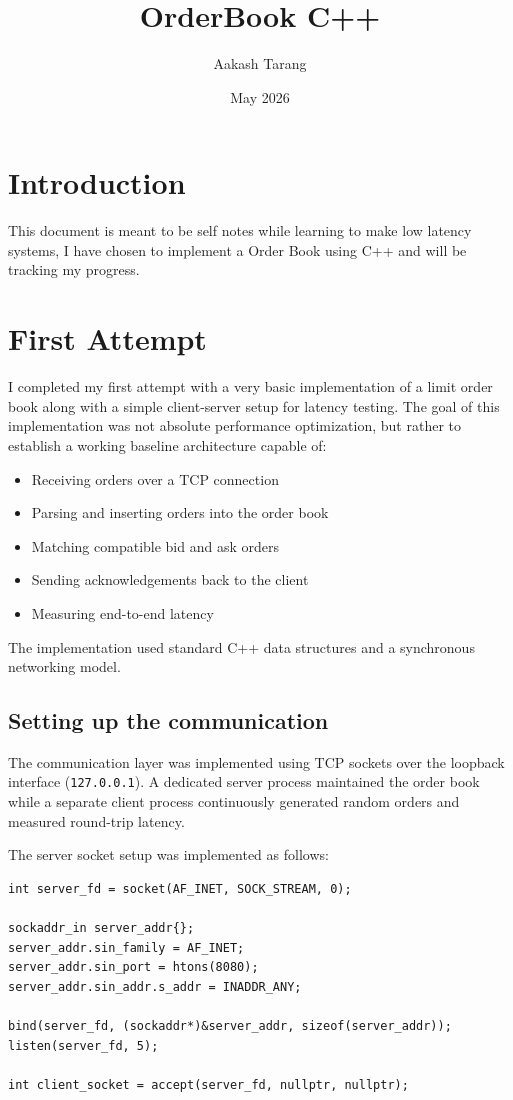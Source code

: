 \documentclass{article}
\title{OrderBook C++}
\author{Aakash Tarang}
\date{May 2026}
\begin{document}
\maketitle

\section{Introduction}

This document is meant to be self notes while learning to make low latency systems, I have chosen to implement a Order Book using C++ and will be tracking my progress.


\section{First Attempt}

I completed my first attempt with a very basic implementation of a limit order book along with a simple client-server setup for latency testing. The goal of this implementation was not absolute performance optimization, but rather to establish a working baseline architecture capable of:

\begin{itemize}
    \item Receiving orders over a TCP connection
    \item Parsing and inserting orders into the order book
    \item Matching compatible bid and ask orders
    \item Sending acknowledgements back to the client
    \item Measuring end-to-end latency
\end{itemize}

The implementation used standard C++ data structures and a synchronous networking model.

\subsection{Setting up the communication}

The communication layer was implemented using TCP sockets over the loopback interface (\texttt{127.0.0.1}). A dedicated server process maintained the order book while a separate client process continuously generated random orders and measured round-trip latency.

The server socket setup was implemented as follows:

\begin{lstlisting}[caption={Server Socket Setup}]
int server_fd = socket(AF_INET, SOCK_STREAM, 0);

sockaddr_in server_addr{};
server_addr.sin_family = AF_INET;
server_addr.sin_port = htons(8080);
server_addr.sin_addr.s_addr = INADDR_ANY;

bind(server_fd, (sockaddr*)&server_addr, sizeof(server_addr));
listen(server_fd, 5);

int client_socket = accept(server_fd, nullptr, nullptr);
\end{lstlisting}
\end{document}
